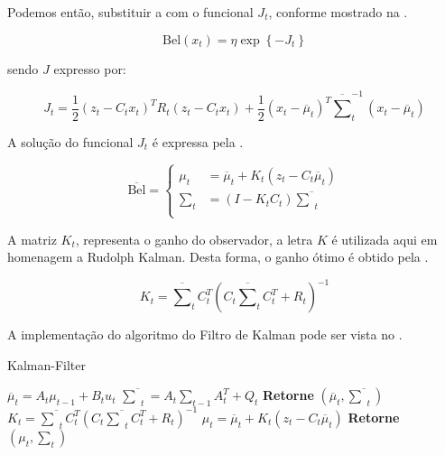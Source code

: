 Podemos então, substituir a  com o funcional $J_t$, conforme mostrado na .

\begin{equation}
    \text{Bel}(x_t)  = \eta  \exp\left\{-J_t\right\}
    \label{eq:bayes15}
\end{equation}

\noindent sendo $J$ expresso por:

\begin{equation}
    J_t = \displaystyle\frac{1}{2} \left(z_t - C_t x_t\right)^T R_t \left(z_t - C_t x_t\right)  +
    \displaystyle\frac{1}{2} \left(x_t - \overline{\mu}_t\right)^T \overline{\textstyle\sum}_t^{-1} \left(x_t - \overline{\mu}_t\right)
\end{equation}

A solução do funcional $J_t$ é expressa pela .

\begin{equation}
    \overline{\text{Bel}} = 
    \left\{
    \begin{aligned}
            \mu_t & = \overline{\mu}_t + K_t(z_t -C_t \overline{\mu}_t)\\
            \textstyle\sum_t & = (I-K_tC_t)\overline{\textstyle\sum}_t \\
    \end{aligned} \right.
    \label{eq:bayes14}
\end{equation}

A matriz $K_t$, representa o ganho do observador, a letra $K$ é utilizada aqui em homenagem a Rudolph Kalman. Desta forma, o ganho ótimo é obtido pela .

\begin{equation}
    \label{eq:bayes16}
    K_t = \overline{\textstyle\sum}_tC_t^T(C_t\overline{\textstyle\sum}_tC_t^T+R_t)^{-1}
\end{equation}

A implementação do algoritmo do Filtro de Kalman pode ser vista no .

\begin{algorithm}[H]
    \caption{Kalman-Filter}
    \begin{algorithmic}[1]
        \State $\overline{\mu}_t = A_t\mu_{t-1} + B_t u_t$
        \State $ \overline{\textstyle\sum}_t = A_t {\textstyle\sum}_{t-1} A_t^T+ Q_t$ 
        \State \textbf{Retorne} $\left(\overline{\mu}_t, \overline{\textstyle\sum}_t\right)$
    \EndProcedure
        \State $K_t = \overline{\textstyle\sum}_tC_t^T(C_t\overline{\textstyle\sum}_tC_t^T+R_t)^{-1}$
        \State $\mu_t  = \overline{\mu}_t + K_t(z_t -C_t\overline\mu_t)$
        \State \textbf{Retorne} $\left(\mu_t, \textstyle\sum_t\right)$
    \EndProcedure
    \end{algorithmic}
    \label{algo:kf}
\end{algorithm}


